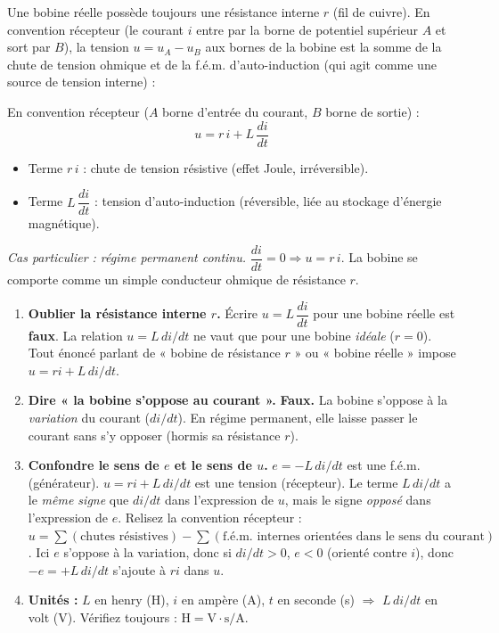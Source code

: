 \documentclass[11pt]{article}
\newcommand{\cle}[1]{{\popxbold\color{popdark}#1}}
\begin{document}
Une bobine réelle possède toujours une résistance interne $r$ (fil de cuivre). En convention récepteur (le courant $i$ entre par la borne de potentiel supérieur $A$ et sort par $B$), la tension $u = u_A - u_B$ aux bornes de la bobine est la somme de la chute de tension ohmique et de la f.é.m. d'auto-induction (qui agit comme une source de tension interne) :

\begin{propriete}[\cle{Tension aux bornes d'une bobine réelle}]
En convention récepteur ($A$ borne d'entrée du courant, $B$ borne de sortie) :
\[
\boxed{u = r\,i + L\,\frac{di}{dt}}
\]
\begin{itemize}
\item Terme $r\,i$ : chute de tension résistive (effet Joule, irréversible).
\item Terme $L\,\dfrac{di}{dt}$ : tension d'auto-induction (réversible, liée au stockage d'énergie magnétique).
\end{itemize}
\emph{Cas particulier : régime permanent continu.} $\dfrac{di}{dt} = 0 \Rightarrow u = r\,i$. La bobine se comporte comme un simple conducteur ohmique de résistance $r$.
\end{propriete}

\begin{attention}
\begin{enumerate}
\item \textbf{Oublier la résistance interne $r$.} Écrire $u = L\,\dfrac{di}{dt}$ pour une bobine réelle est \textbf{faux}. La relation $u = L\,di/dt$ ne vaut que pour une bobine \emph{idéale} ($r=0$). Tout énoncé parlant de « bobine de résistance $r$ » ou « bobine réelle » impose $u = r i + L\,di/dt$.
\item \textbf{Dire « la bobine s'oppose au courant ».} \textbf{Faux.} La bobine s'oppose à la \emph{variation} du courant ($di/dt$). En régime permanent, elle laisse passer le courant sans s'y opposer (hormis sa résistance $r$).
\item \textbf{Confondre le sens de $e$ et le sens de $u$.} $e = -L\,di/dt$ est une f.é.m. (générateur). $u = r i + L\,di/dt$ est une tension (récepteur). Le terme $L\,di/dt$ a le \emph{même signe} que $di/dt$ dans l'expression de $u$, mais le signe \emph{opposé} dans l'expression de $e$. Relisez la convention récepteur : $u = \sum (\text{chutes résistives}) - \sum (\text{f.é.m. internes orientées dans le sens du courant})$. Ici $e$ s'oppose à la variation, donc si $di/dt>0$, $e<0$ (orienté contre $i$), donc $-e = +L\,di/dt$ s'ajoute à $r i$ dans $u$.
\item \textbf{Unités :} $L$ en henry (H), $i$ en ampère (A), $t$ en seconde (s) $\Rightarrow$ $L\,di/dt$ en volt (V). Vérifiez toujours : $\text{H} = \text{V}\cdot\text{s}/\text{A}$.
\end{enumerate}
\end{attention}
\end{document}
